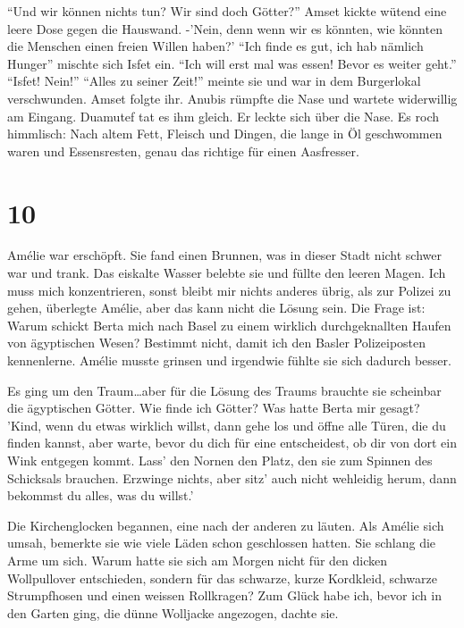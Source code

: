 \documentclass[11pt,titlepage,a5paper]{book}
\begin{document}
"`Und wir können nichts tun? Wir sind doch Götter?"' Amset kickte wütend eine leere Dose gegen die Hauswand. -'Nein, denn wenn wir es könnten, wie könnten die Menschen einen freien Willen haben?' "`Ich finde es gut, ich hab nämlich Hunger"' mischte sich Isfet ein. "`Ich will erst mal was essen! Bevor es weiter geht."' "`Isfet! Nein!"' "`Alles zu seiner Zeit!"' meinte sie und war in dem Burgerlokal verschwunden. Amset folgte ihr. Anubis rümpfte die Nase und wartete widerwillig am Eingang. Duamutef tat es ihm gleich. Er leckte sich über die Nase. Es roch himmlisch: Nach altem Fett, Fleisch und Dingen, die lange in Öl geschwommen waren und Essensresten, genau das richtige für einen Aasfresser.

\section*{10}

Amélie war erschöpft. Sie fand einen Brunnen, was in dieser Stadt nicht schwer war und trank. Das eiskalte Wasser belebte sie und füllte den leeren Magen. Ich muss mich konzentrieren, sonst bleibt mir nichts anderes übrig, als zur Polizei zu gehen, überlegte Amélie, aber das kann nicht die Lösung sein. Die Frage ist: Warum schickt Berta mich nach Basel zu einem wirklich durchgeknallten Haufen von ägyptischen Wesen? Bestimmt nicht, damit ich den Basler Polizeiposten kennenlerne. Amélie musste grinsen und irgendwie fühlte sie sich dadurch besser. 

Es ging um den Traum\dots aber für die Lösung des Traums brauchte sie scheinbar die ägyptischen Götter. Wie finde ich Götter? Was hatte Berta mir gesagt? 'Kind, wenn du etwas wirklich willst, dann gehe los und öffne alle Türen, die du finden kannst, aber warte, bevor du dich für eine entscheidest, ob dir von dort ein Wink entgegen kommt. Lass' den Nornen den Platz, den sie zum Spinnen  des Schicksals brauchen. Erzwinge nichts, aber sitz' auch nicht wehleidig herum, dann bekommst du alles, was du willst.'

Die Kirchenglocken begannen, eine nach der anderen zu läuten. Als Amélie sich umsah, bemerkte sie wie viele Läden schon geschlossen hatten. Sie schlang die Arme um sich. Warum hatte sie sich am Morgen nicht für den dicken Wollpullover entschieden, sondern für das schwarze, kurze Kordkleid, schwarze Strumpfhosen und einen weissen Rollkragen? Zum Glück habe ich, bevor ich in den Garten ging, die dünne Wolljacke angezogen, dachte sie.
 
\end{document}
